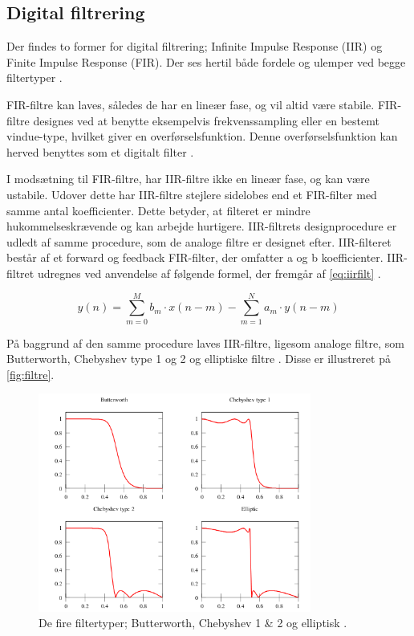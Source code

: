\subsection{Digital filtrering} \label{sec:teori_filter}
Der findes to former for digital filtrering; Infinite Impulse Response (IIR) og Finite Impulse Response (FIR). Der ses hertil både fordele og ulemper ved begge filtertyper \citep{blandford2012}.

FIR-filtre kan laves, således de har en lineær fase, og vil altid være stabile. FIR-filtre designes ved at benytte eksempelvis frekvenssampling eller en bestemt vindue-type, hvilket giver en overførselsfunktion. Denne overførselsfunktion kan herved benyttes som et digitalt filter \citep{blandford2012}. 

I modsætning til FIR-filtre, har IIR-filtre ikke en lineær fase, og kan være ustabile. Udover dette har IIR-filtre stejlere sidelobes end et FIR-filter med samme antal koefficienter. Dette betyder, at filteret er mindre hukommelseskrævende og kan arbejde hurtigere. IIR-filtrets designprocedure er udledt af samme procedure, som de analoge filtre er designet efter.
IIR-filteret består af et forward og feedback FIR-filter, der omfatter a og b koefficienter. IIR-filtret udregnes ved anvendelse af følgende formel, der fremgår af \autoref{eq:iirfilt} \citep{francis2009}. 

\begin{equation} \label{eq:iirfilt}
	y(n)= \sum_{m=0}^{M} b_{m} \cdot x(n-m)- \sum^{N}_{m=1} a_{m} \cdot y(n-m)
\end{equation}


På baggrund af den samme procedure laves IIR-filtre, ligesom analoge filtre, som Butterworth, Chebyshev type 1 og 2 og elliptiske filtre \citep{blandford2012}. Disse er illustreret på \autoref{fig:filtre}.

\begin{figure}[H]
\centering
\includegraphics[width=0.8\textwidth]{figures/filtre}
\caption{De fire filtertyper; Butterworth, Chebyshev 1 \& 2 og elliptisk \citep{wikipedia2016}.}
\label{fig:filtre}
\end{figure}

